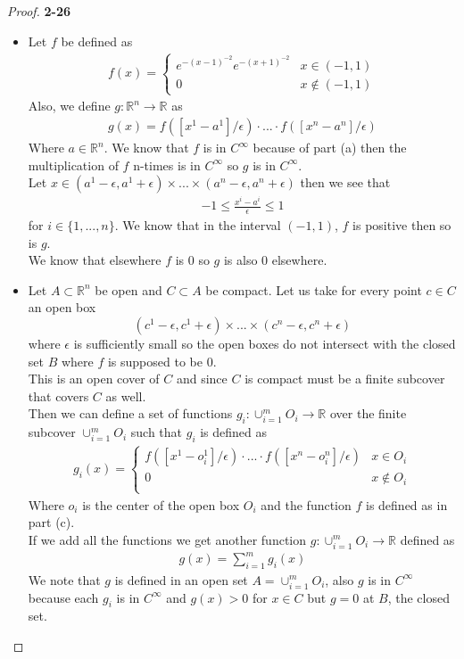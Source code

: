 \documentclass[11pt]{article}
\newcommand{\R}{\mathbb{R}}
\theoremstyle{definition}
\begin{document}
\begin{proof}{\textbf{2-26}}
\begin{itemize}
\cleardoublepage
\item [(c)] Let $f$ be defined as 
\begin{align*}
    f(x) = \begin{cases}
        e^{-(x-1)^{-2}} e^{-(x+1)^{-2}} & x \in (-1,1)\\
        0 & x \not\in (-1, 1)
    \end{cases}
\end{align*}
Also, we define $g:\R^n \to \R$ as 
\begin{align*}
    g(x) = f([x^1 - a^1]/\epsilon) \cdot ... \cdot f([x^n - a^n]/\epsilon)
\end{align*}
Where $a \in \R^n$.
We know that $f$ is in $C^\infty$ because of part (a) then the
multiplication of $f$ n-times is in $C^\infty$ so $g$ is in $C^\infty$.
\\
Let $x \in (a^1 - \epsilon, a^1 + \epsilon) \times ... \times
(a^n - \epsilon, a^n + \epsilon)$ then we see that
\begin{align*}
    -1 \leq \frac{x^i - a^i}{\epsilon} \leq 1
\end{align*}
for $i \in \{1, ..., n\}$. We know that in the interval $(-1,1)$, $f$
is positive then so is $g$. \\
We know that elsewhere $f$ is 0 so $g$ is also 0 elsewhere.

\item [(d)] Let $A\subset \R^n$ be open and $C\subset A$ be compact.
Let us take for every point $c \in C$ an open box
$$(c^1 - \epsilon, c^1 + \epsilon) \times ... \times (c^n - \epsilon, c^n + \epsilon)$$
where $\epsilon$ is sufficiently small so the open boxes do not intersect with
the closed set $B$ where $f$ is supposed to be $0$.
\\
This is an open cover of $C$ and since $C$ is compact must be a finite subcover
that covers $C$ as well.
\\
Then we can define a set of functions $g_i: \cup_{i = 1}^m O_i \to \R$ over
the finite subcover $\cup_{i = 1}^m O_i$ such that $g_i$ is defined as
\begin{align*}
    g_i(x) = \begin{cases}
        f([x^1 - o_i^1]/\epsilon) \cdot ... \cdot f([x^n - o_i^n]/\epsilon)
        & x \in O_i\\
        0 & x \not\in O_i\\
    \end{cases}
\end{align*}
Where $o_i$ is the center of the open box $O_i$ and the function $f$ is defined
as in part (c).
\\
If we add all the functions we get another function $g: \cup_{i = 1}^m O_i \to \R$
defined as
\begin{align*}
    g(x) = \sum_{i=1}^m g_i(x)
\end{align*}
We note that $g$ is defined in an open set $A =\cup_{i = 1}^m O_i$, also $g$ is
in $C^\infty$ because each $g_i$ is in $C^\infty$ and $g(x) > 0$ for $x \in C$
but $g = 0$ at $B$, the closed set.


\end{itemize}
\end{proof}
\end{document}
